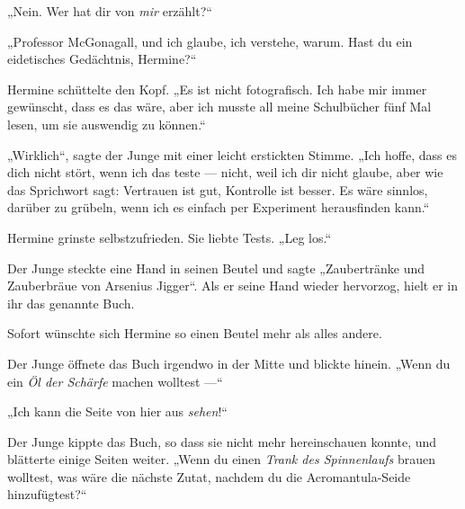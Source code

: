 „Nein. Wer hat dir von \emph{mir} erzählt?“

„Professor McGonagall, und ich glaube, ich verstehe, warum. Hast du ein eidetisches Gedächtnis, Hermine?“

Hermine schüttelte den Kopf.
„Es ist nicht fotografisch. Ich habe mir immer gewünscht, dass es das wäre, aber ich musste all meine Schulbücher fünf Mal lesen, um sie auswendig zu können.“

„Wirklich“, sagte der Junge mit einer leicht erstickten Stimme.
„Ich hoffe, dass es dich nicht stört, wenn ich das teste — nicht, weil ich dir nicht glaube, aber wie das Sprichwort sagt: Vertrauen ist gut, Kontrolle ist besser. Es wäre sinnlos, darüber zu grübeln, wenn ich es einfach per Experiment herausfinden kann.“

Hermine grinste selbstzufrieden. Sie liebte Tests.
„Leg los.“

Der Junge steckte eine Hand in seinen Beutel und sagte
„Zaubertränke und Zauberbräue von Arsenius Jigger“. Als er seine Hand wieder hervorzog, hielt er in ihr das genannte Buch.

Sofort wünschte sich Hermine so einen Beutel mehr als alles andere.

Der Junge öffnete das Buch irgendwo in der Mitte und blickte hinein.
„Wenn du ein \emph{Öl der Schärfe} machen wolltest —“

„Ich kann die Seite von hier aus \emph{sehen}!“

Der Junge kippte das Buch, so dass sie nicht mehr hereinschauen konnte, und blätterte einige Seiten weiter.
„Wenn du einen \emph{Trank des Spinnenlaufs} brauen wolltest, was wäre die nächste Zutat, nachdem du die Acromantula-Seide hinzufügtest?“

